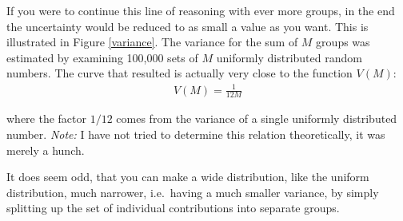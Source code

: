 \documentclass[onecolumn]{article}
\begin{document}
If you were to continue this line of reasoning with ever more groups, in the
end the uncertainty would be reduced to as small a value as you want. This is
illustrated in Figure \ref{variance}. The variance for the sum of $M$ groups was
estimated by examining 100,000 sets of $M$ uniformly distributed random numbers.
The curve that resulted is actually very close to the function $V(M)$:
\begin{eqnarray}
\nonumber V(M) = \frac{1}{12M}
\end{eqnarray}

\noindent where the factor $1/12$ comes from the variance of a single uniformly
distributed number. \emph{Note:} I have not tried to determine this relation theoretically,
it was merely a hunch.

It does seem odd, that you can make a wide distribution, like the uniform
distribution, much narrower, i.e.\ having a much smaller variance, by simply
splitting up the set of individual contributions into separate groups.



\end{document}
